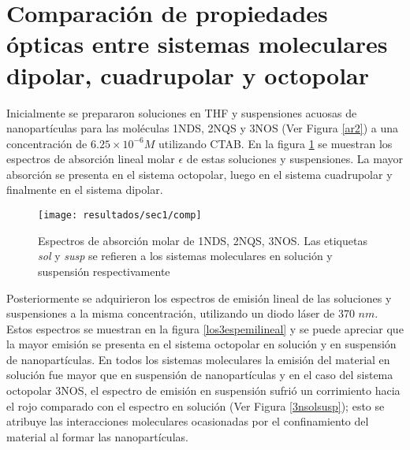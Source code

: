 \section{Comparaci\'on de propiedades \'opticas entre sistemas moleculares dipolar, cuadrupolar y octopolar}

Inicialmente se prepararon soluciones en THF y suspensiones acuosas de nanopart\'iculas para las mol\'eculas 1NDS, 2NQS y 3NOS (Ver Figura \ref{ar2}) a una concentraci\'on de $6.25 \times 10^{-6} M$ utilizando CTAB. En la figura \ref{X} se muestran los espectros de absorci\'on lineal molar $\epsilon$ de estas soluciones y suspensiones. La mayor absorci\'on se presenta en el sistema octopolar, luego en el sistema cuadrupolar y finalmente en el sistema dipolar. 

\begin{figure}[h]
\centering
\texttt{[image: resultados/sec1/comp]}
\caption{Espectros de absorci\'on molar de 1NDS, 2NQS, 3NOS. Las etiquetas \emph{sol} y \emph{susp} se refieren a los sistemas moleculares en soluci\'on y suspensi\'on respectivamente}\label{X}
\end{figure}

Posteriormente se adquirieron los espectros de emisi\'on lineal de las soluciones y suspensiones a la misma concentraci\'on, utilizando un diodo l\'aser de 370 $nm$. Estos espectros se muestran en la figura \ref{los3espemilineal} y se puede apreciar que la mayor emisi\'on se presenta en el sistema octopolar en soluci\'on y en suspensi\'on de nanopart\'iculas. En todos los sistemas moleculares la emisi\'on del material en soluci\'on fue mayor que en suspensi\'on de nanopart\'iculas y en el caso del sistema octopolar 3NOS, el espectro de emisi\'on en suspensi\'on sufri\'o un corrimiento hacia el rojo comparado con el espectro en soluci\'on (Ver Figura \ref{3nsolsusp}); esto se atribuye las interacciones moleculares ocasionadas por el confinamiento del material al formar las nanopart\'iculas.  



